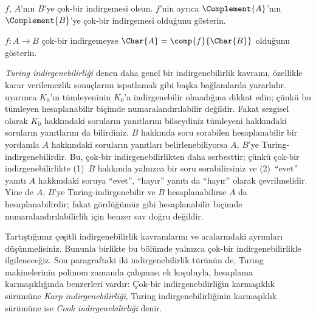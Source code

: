 \begin{prob}
$f$, $A$'nın $B$'ye çok-bir indirgemesi olsun. $f$'nin ayrıca
$\Complement{A}$'nın $\Complement{B}$'ye çok-bir indirgemesi olduğunu
gösterin.
\end{prob}

\begin{prob}
$f\colon A\to B$ çok-bir indirgemeyse
$\Char{A}=\comp{f}{\Char{B}}$ olduğunu gösterin.
\end{prob}

\begin{digress}
\emph{Turing indirgenebilirliği} denen daha genel bir indirgenebilirlik
kavramı, özellikle karar verilemezlik sonuçlarını ispatlamak gibi başka
bağlamlarda yararlıdır.  uyarınca $K_0$'ın tümleyeninin
$K_0$'a indirgenebilir olmadığına dikkat edin; çünkü bu tümleyen
hesaplanabilir biçimde numaralandırılabilir değildir. Fakat sezgisel olarak
$K_0$ hakkındaki soruların yanıtlarını bilseydiniz tümleyeni hakkındaki
soruların yanıtlarını da bilirdiniz. $B$ hakkında soru sorabilen
hesaplanabilir bir yordamla $A$ hakkındaki soruların yanıtları
belirlenebiliyorsa $A$, $B$'ye Turing-indirgenebilirdir. Bu, çok-bir
indirgenebilirlikten daha serbesttir; çünkü çok-bir indirgenebilirlikte
(1)~$B$ hakkında yalnızca bir soru sorabilirsiniz ve (2)~``evet'' yanıtı
$A$ hakkındaki soruya ``evet'', ``hayır'' yanıtı da ``hayır'' olarak
çevrilmelidir. Yine de $A$, $B$'ye Turing-indirgenebilir ve $B$
hesaplanabilirse $A$ da hesaplanabilirdir; fakat gördüğümüz gibi hesaplanabilir
biçimde numaralandırılabilirlik için benzer sav doğru değildir.

Tartıştığımız çeşitli indirgenebilirlik kavramlarını ve aralarındaki ayrımları
düşünmelisiniz. Bununla birlikte bu bölümde yalnızca çok-bir
indirgenebilirlikle ilgileneceğiz. Son paragraftaki iki indirgenebilirlik
türünün de, Turing makinelerinin polinom zamanda çalışması ek koşuluyla,
hesaplama karmaşıklığında benzerleri vardır: Çok-bir indirgenebilirliğin
karmaşıklık sürümüne \emph{Karp indirgenebilirliği}, Turing
indirgenebilirliğinin karmaşıklık sürümüne ise \emph{Cook indirgenebilirliği}
denir.
\end{digress}

